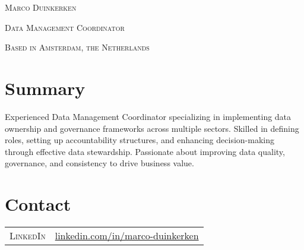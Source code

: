 \documentclass[a4paper,10pt]{article}
\begin{document}
\par{
  
    \Huge \textsc{Marco Duinkerken}\par
    \large \textsc{Data Management Coordinator}\par
    \small \textsc{{Based in Amsterdam, the Netherlands}}\par  
  \par
}
\section*{Summary}
Experienced Data Management Coordinator specializing in implementing data ownership and governance frameworks across multiple sectors. Skilled in defining roles, setting up accountability structures, and enhancing decision-making through effective data stewardship. Passionate about improving data quality, governance, and consistency to drive business value.

\vspace{0.5em}

\section{Contact}
\begin{tabular}{r l}
  \textsc{\faLinkedin{} LinkedIn} &  \href{https://www.linkedin.com/in/marco-duinkerken/}{linkedin.com/in/marco-duinkerken}\\
\end{tabular}
\end{document}
